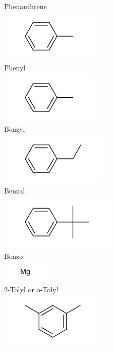 \documentclass[10pt]{article}
\begin{document}
Phenanthrene\\
\includegraphics{smile-c69cd0596ff390addfc0b79a9ed83d76c7eef9f6}\\
Phenyl\\
\includegraphics{smile-52895987ec17fe1fa6e857ce2d4c8601f695c8ee}\\
Benzyl\\
\includegraphics{smile-17a07b47d31fd9f6a8f41a78dddbb3ac7a2d292d}\\
Benzal\\
\includegraphics{smile-eccfc4098d2f94e0106b6f47c2c26667bfac2cab}\\
Benzo\\
\includegraphics{smile-45a523d7ee6d19b4918447edd319ad8916d57ac3}\\
2-Tolyl or o-Toly!\\
\includegraphics{smile-60531ef8141d1b61f4c7e34fe7f6c18e7bfac540}\\
\end{document}
